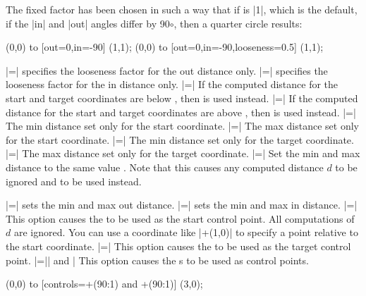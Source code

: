 \begin{itemize}
  The fixed factor has been chosen in such a way that if 
  is |1|, which is the default, if the |in| and |out| angles differ by
  90$\circ$, then a quarter circle results:
  \begin{codeexample}[]
\tikz \draw (0,0) to [out=0,in=-90]               (1,1);
\tikz \draw (0,0) to [out=0,in=-90,looseness=0.5] (1,1);
  \end{codeexample}

  |=|
  specifies the looseness factor for the out distance only. 
  |=|
  specifies the looseness factor for the in distance only.
  |=|
  If the computed distance for the start and target coordinates are
  below , then  is used instead.
  |=|
  If the computed distance for the start and target coordinates are
  above , then  is used instead.
  |=|
  The min distance set only for the start coordinate.
  |=|
  The max distance set only for the start coordinate.
  |=|
  The min distance set only for the target coordinate.
  |=|
  The max distance set only for the target coordinate.
  |=|
  Set the min and max distance to the same value . Note
  that this causes any computed distance $d$ to be ignored and
   to be used instead.
\begin{codeexample}[]
\end{codeexample}
  |=|
  sets the min and max out distance.
  |=|
  sets the min and max in distance.
  |=|
  This option causes the  to be used as the start
  control point. All computations of $d$ are ignored. You can use a
  coordinate like |+(1,0)| to specify a point relative to the start
  coordinate. 
  |=|
  This option causes the  to be used as the target
  control point.
  |=|| and |
  This option causes the s to be used as control
  points. 
\begin{codeexample}[]
\tikz \draw (0,0) to [controls=+(90:1) and +(90:1)] (3,0);
\end{codeexample}
\end{itemize}


